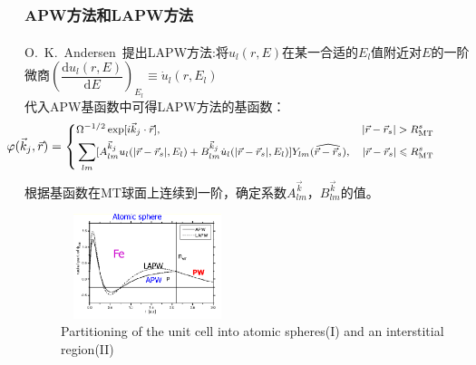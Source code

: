 \documentclass[cjk,slidestop,compress,mathserif,blue]{beamer}
\newcommand{\upcite}[1]{\hspace{0ex}\textsuperscript{\cite{#1}}} %
\begin{document}
\frame
{
\frametitle{\textrm{APW}方法和\textrm{LAPW}方法}
\textrm{O.~K.~Andersen~}提出\textrm{LAPW}方法\upcite{Singh_Book}:将$u_l(r,E)$在某一合适的$E_l$值附近对$E$的一阶微商{\footnotesize$\left(\dfrac{\textrm{d}u_l(r,E)}{\textrm{d}E}\right)_{E_l}\equiv\dot u_l(r,E_l)$}\\代入\textrm{APW}基函数中可得\textrm{LAPW}方法的基函数：
$${\footnotesize\hskip -50pt \varphi(\vec k_j,\vec r)=\left\{
  \begin{aligned}
    &\Omega^{-1/2}\exp[i\vec k_j\cdot\vec r],&|\vec r-\vec r_s|>R_{\mathrm{MT}}^s\\
    &\sum_{lm}[A^{\vec k_j}_{lm}u_l(|\vec r-\vec r_s|,E_l)+B^{\vec k_j}_{lm}\dot u_l(|\vec r-\vec r_s|,E_l)]Y_{lm}(\widehat{\vec r-\vec r_s}),&|\vec r-\vec r_s|\leqslant R_{\mathrm{MT}}^s
  \end{aligned}
\right.}$$
根据基函数在\textrm{MT}球面上连续到一阶，确定系数$A^{\vec k}_{lm}$，$B^{\vec k}_{lm}$的值。
\begin{figure}[h!]
\centering
\includegraphics[height=1.20in,width=1.98in,viewport=1 20 585 435,clip]{Figures/WIEN2k-LAPW.png}
\caption{\small \textrm{Partitioning of the unit cell into atomic spheres(I) and an interstitial region(II)}}%
\label{Muffin_tin}
\end{figure}
}
\frame
\end{document}
